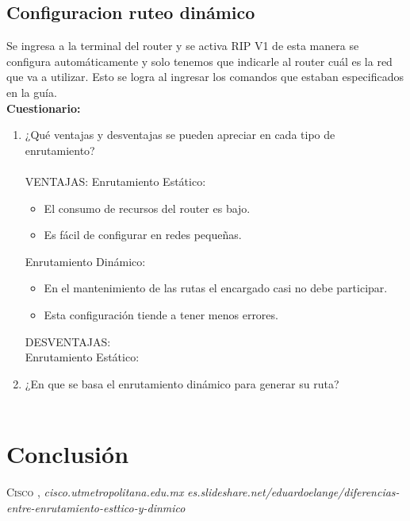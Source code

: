\documentclass{udpreport}
\begin{document}
	\section{Configuracion ruteo dinámico}
	Se ingresa a la terminal del router y se activa RIP V1 de esta manera se configura automáticamente y solo tenemos que
	indicarle al router cuál es la red que va a utilizar. Esto se logra al ingresar los comandos que estaban especificados en la
	guía.\\
{\large \bf{Cuestionario: }}\\
	\begin{enumerate}
	    \item ¿Qué ventajas y desventajas se pueden apreciar en cada tipo de enrutamiento?\\\\
	    VENTAJAS:
	    Enrutamiento Estático:\\
	    \begin{itemize}
	    	\item El consumo de recursos del router es bajo.
	    	\item Es fácil de configurar en redes pequeñas.
	    \end{itemize}
	    Enrutamiento Dinámico:\\
	    \begin{itemize}
	    	\item En el mantenimiento de las rutas el encargado casi no debe participar.
	    	\item Esta configuración tiende a tener menos errores.
	    \end{itemize}
	    DESVENTAJAS:\\
	    Enrutamiento Estático:\\
            \item ¿En que se basa el enrutamiento dinámico para generar su ruta?\\\\
 
  	     
	\end{enumerate}
	
    
	
\chapter{Conclusión}
 
\begin{thebibliography}{x}
 \textsc{Cisco },
\textit{cisco.utmetropolitana.edu.mx}
\textit{es.slideshare.net/eduardoelange/diferencias-entre-enrutamiento-esttico-y-dinmico}

\end{thebibliography}
\end{document}
